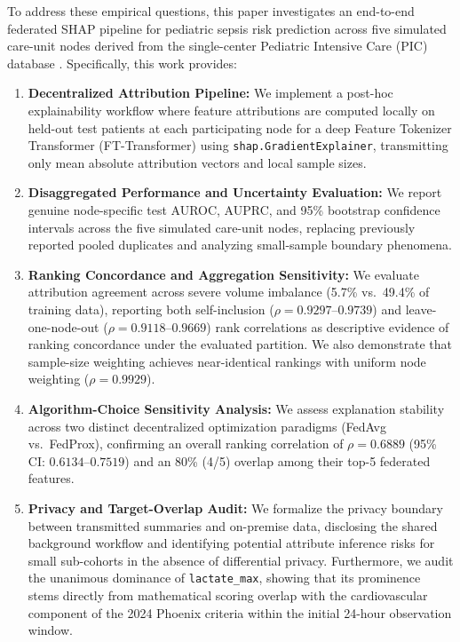 \documentclass[conference,a4paper]{IEEEtran}
\begin{document}
To address these empirical questions, this paper investigates an end-to-end federated SHAP pipeline for pediatric sepsis risk prediction across five simulated care-unit nodes derived from the single-center Pediatric Intensive Care (PIC) database \cite{zeng2020pic}. Specifically, this work provides:
\begin{enumerate}
\item \textbf{Decentralized Attribution Pipeline:} We implement a post-hoc explainability workflow where feature attributions are computed locally on held-out test patients at each participating node for a deep Feature Tokenizer Transformer (FT-Transformer) using \texttt{shap.GradientExplainer}, transmitting only mean absolute attribution vectors and local sample sizes.
\item \textbf{Disaggregated Performance and Uncertainty Evaluation:} We report genuine node-specific test AUROC, AUPRC, and 95\% bootstrap confidence intervals across the five simulated care-unit nodes, replacing previously reported pooled duplicates and analyzing small-sample boundary phenomena.
\item \textbf{Ranking Concordance and Aggregation Sensitivity:} We evaluate attribution agreement across severe volume imbalance (5.7\% vs.\ 49.4\% of training data), reporting both self-inclusion ($\rho = 0.9297$--$0.9739$) and leave-one-node-out ($\rho = 0.9118$--$0.9669$) rank correlations as descriptive evidence of ranking concordance under the evaluated partition. We also demonstrate that sample-size weighting achieves near-identical rankings with uniform node weighting ($\rho = 0.9929$).
\item \textbf{Algorithm-Choice Sensitivity Analysis:} We assess explanation stability across two distinct decentralized optimization paradigms (FedAvg vs.\ FedProx), confirming an overall ranking correlation of $\rho = 0.6889$ (95\% CI: $0.6134$--$0.7519$) and an 80\% (4/5) overlap among their top-5 federated features.
\item \textbf{Privacy and Target-Overlap Audit:} We formalize the privacy boundary between transmitted summaries and on-premise data, disclosing the shared background workflow and identifying potential attribute inference risks for small sub-cohorts in the absence of differential privacy. Furthermore, we audit the unanimous dominance of \texttt{lactate\_max}, showing that its prominence stems directly from mathematical scoring overlap with the cardiovascular component of the 2024 Phoenix criteria within the initial 24-hour observation window.
\end{enumerate}
\end{document}
